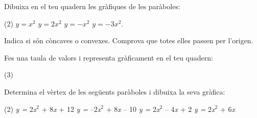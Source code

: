 \begin{mylist}


\exer  Dibuixa en el teu quadern les gràfiques de les paràboles: 
\begin{tasks}(2)
	\task  $y =  \textit{x}^{2}$   
	\task  $y = 2 \textit{x}^{2}$
	\task  $y =\textit{$-$x}^{2}$
	\task  $y = -3\textit{x}^{2}$. 
\end{tasks}
Indica si són còncaves o convexes. Comprova que totes elles passen per l'origen.


\exer  Fes una taula de valors i representa gràficament en el teu quadern: 
\begin{tasks}(3)
\end{tasks}
 
 \exer  Determina el vèrtex de les següents paràboles i dibuixa la seva gràfica:
 
 \begin{tasks}(2)
 	\task  \textit{y =} 2\textit{x}${}^{2}$ + 8\textit{x} + 12                       
 	\task  \textit{y =} --2\textit{x}${}^{2}$ + 8\textit{x} -- 10            
 	\task  \textit{y =} 2\textit{x}${}^{2}$ -- 4\textit{x} + 2  
 	\task  \textit{y =} 2\textit{x}${}^{2}$ + 6\textit{x}
 \end{tasks}


\end{mylist}
